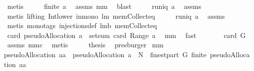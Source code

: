 \begin{isabellebody}
\ metis\isanewline
\ \ \isamarkupfalse%
\ \isamarkupfalse%
\ {\isachardoublequoteopen}finite\ a{\isachardoublequoteclose}\ \isamarkupfalse%
\ assms\ mm{}{}\ \isamarkupfalse%
\ blast\isanewline
\ \ \isamarkupfalse%
\ \isamarkupfalse%
\ {\isachardoublequoteopen}runiq\ a{\isachardoublequoteclose}\ \isamarkupfalse%
\ assms\ \isamarkupfalse%
\ {\isacharparenleft}metis\ {\isacharparenleft}lifting{\isacharparenright}\ Int{\isacharunderscore}lower{}\ in{\isacharunderscore}mono\ lm{}{}\ mem{\isacharunderscore}Collect{\isacharunderscore}eq{\isacharparenright}\isanewline
\ \ \isamarkupfalse%
\ \isamarkupfalse%
\ {\isachardoublequoteopen}runiq\ {\isacharparenleft}a{\isacharcircum}{\isacharminus}{}{\isacharparenright}{\isachardoublequoteclose}\ \isamarkupfalse%
\ assms\ \isamarkupfalse%
\ {\isacharparenleft}metis\ {\isacharparenleft}mono{\isacharunderscore}tags{\isacharparenright}\ injections{\isacharunderscore}def\ lm{}{}b\ mem{\isacharunderscore}Collect{\isacharunderscore}eq{\isacharparenright}\isanewline
\ \ \isamarkupfalse%
\ \isamarkupfalse%
\ {\isachardoublequoteopen}card\ {\isacharparenleft}pseudoAllocation\ a{\isacharparenright}\ {\isacharequal}\ setsum\ card\ {\isacharparenleft}Range\ a{\isacharparenright}{\isachardoublequoteclose}\ \isamarkupfalse%
\ mm{}{}\ \isamarkupfalse%
\ fast\isanewline
\ \ \isamarkupfalse%
\ \isamarkupfalse%
\ {\isachardoublequoteopen}{\isachardot}{\isachardot}{\isachardot}\ {\isacharequal}\ card\ G{\isachardoublequoteclose}\ \isamarkupfalse%
\ assms\ mm{}{}c\ \isamarkupfalse%
\ metis\isanewline
\ \ \isamarkupfalse%
\ \isamarkupfalse%
\ {\isacharquery}thesis\ \isamarkupfalse%
\ presburger\isanewline
{}\isamarkupfalse%
%
\endisatagproof
{\isafoldproof}%
%
\isadelimproof
\isanewline
%
\endisadelimproof
\isanewline
{}\isamarkupfalse%
\ mm{}{}{\isacharcolon}\ \ \isanewline
{\isachardoublequoteopen}pseudoAllocation\ aa\ {\isasymsubseteq}\ pseudoAllocation\ a\ {\isasymunion}\ {\isacharparenleft}N\ {\isasymtimes}\ {\isacharparenleft}finestpart\ G{\isacharparenright}{\isacharparenright}{\isachardoublequoteclose}\ {\isachardoublequoteopen}finite\ {\isacharparenleft}pseudoAllocation\ aa{\isacharparenright}{\isachardoublequoteclose}\isanewline

\end{isabellebody}
